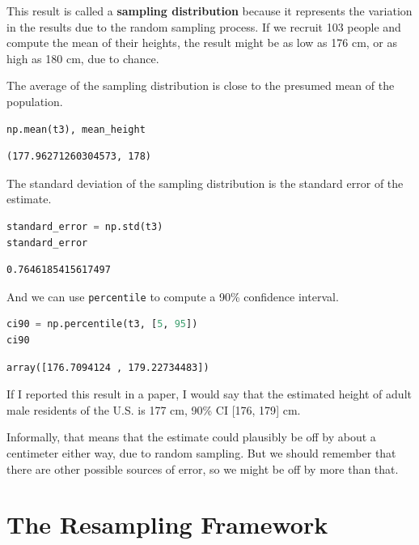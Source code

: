 This result is called a \textbf{sampling distribution} because it
represents the variation in the results due to the random sampling
process. If we recruit 103 people and compute the mean of their heights,
the result might be as low as 176 cm, or as high as 180 cm, due to
chance.

The average of the sampling distribution is close to the presumed mean
of the population.

\begin{lstlisting}[language=Python,style=source]
np.mean(t3), mean_height
\end{lstlisting}

\begin{lstlisting}[style=output]
(177.96271260304573, 178)
\end{lstlisting}

The standard deviation of the sampling distribution is the standard
error of the estimate.

\begin{lstlisting}[language=Python,style=source]
standard_error = np.std(t3)
standard_error
\end{lstlisting}

\begin{lstlisting}[style=output]
0.7646185415617497
\end{lstlisting}

And we can use \passthrough{\lstinline!percentile!} to compute a 90\%
confidence interval.

\begin{lstlisting}[language=Python,style=source]
ci90 = np.percentile(t3, [5, 95])
ci90
\end{lstlisting}

\begin{lstlisting}[style=output]
array([176.7094124 , 179.22734483])
\end{lstlisting}

If I reported this result in a paper, I would say that the estimated
height of adult male residents of the U.S. is 177 cm, 90\% CI {[}176,
179{]} cm.

Informally, that means that the estimate could plausibly be off by about
a centimeter either way, due to random sampling. But we should remember
that there are other possible sources of error, so we might be off by
more than that.

\hypertarget{the-resampling-framework}{%
\section{The Resampling Framework}\label{the-resampling-framework}}

